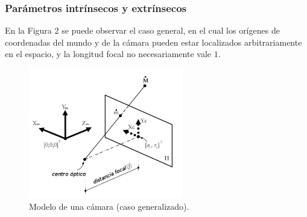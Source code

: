 \documentclass[11pt,a4paper,titlepage]{article}
\newcommand{\Figure}[1]{Figura #1}
\begin{document}
\subsubsection{Parámetros intrínsecos y extrínsecos}

En la \Figure{2} se puede observar el caso general, en el cual los orígenes de coordenadas del mundo y de la cámara pueden estar localizados arbitrariamente en el espacio, y la longitud focal no necesariamente vale $1$.


\begin{figure}[h!]

  \centering
    \includegraphics[width=0.6\textwidth]{f2.png}
  \caption{Modelo de una cámara (caso generalizado).}
\end{figure}
\end{document}

